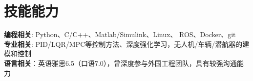 \documentclass[letterpaper,11pt]{article}
\begin{document}


\section{技能能力}
 \begin{itemize}[leftmargin=0.15in, label={}]
    \small{\item{
    \vspace{1mm}
     \textbf{编程相关}{: Python、C/C++、Matlab/Simulink、Linux、 ROS、Docker、git} \\
     \vspace{1mm}
     \textbf{专业相关}{: PID/LQR/MPC等控制方法、深度强化学习，无人机/车辆/潜航器的建模和控制} \\
     \vspace{1mm}
     \textbf{语言相关}{：英语雅思6.5（口语7.0），曾深度参与外国工程团队，具有较强沟通能力}

    }}
 \end{itemize}

\end{document}
